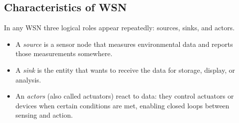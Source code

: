 \subsection{Characteristics of WSN}
In any WSN three logical roles appear repeatedly: sources, sinks, and actors. 
\begin{itemize}
    \item A \textit{source} is a sensor node that measures environmental data and reports those measurements somewhere. 
    \item A \textit{sink} is the entity that wants to receive the data for storage, display, or analysis. 
    \item An \textit{actors} (also called actuators) react to data: they control actuators or devices when certain conditions are met, enabling closed loops between sensing and action.
\end{itemize}

